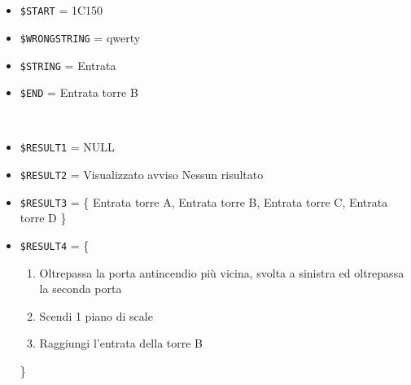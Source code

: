 \documentclass[../../Sperimentazione.tex]{subfiles}
\begin{document}
			\paragraph*{}
			\label{Prova11A.1}
			\begin{tcolorbox}[fonttitle=\bfseries, 
								adjusted title={\Large Prova 11A.1}, 
								breakable, 
								sharp corners=south,
								colback=white, 
								colframe=white!60!black]
								
				\begin{description}[leftmargin=0.7cm,labelwidth=!]
				
					\item[Input] \ \par 
        				\begin{itemize}
        					\item \verb|$START| = 1C150
							\item \verb|$WRONGSTRING| = qwerty
							\item \verb|$STRING| = Entrata 
							\item \verb|$END| = Entrata torre B
        				\end{itemize}
        				
        			\tcbline 
        				
        			\item[Output atteso] \ \par
        				\begin{itemize}
        					\item \verb|$RESULT1| = NULL
        					\item \verb|$RESULT2| = Visualizzato avviso Nessun risultato
        					\item \verb|$RESULT3| = \{
        						Entrata torre A, Entrata torre B, Entrata torre C, Entrata torre D
        						\}
        					\item \verb|$RESULT4| = \{
								\begin{enumerate}
        									\item Oltrepassa la porta antincendio più vicina, svolta a sinistra ed oltrepassa la seconda porta
        									\item Scendi 1 piano di scale
        									\item Raggiungi l'entrata della torre B
        								\end{enumerate}							       
        						\}
        				\end{itemize}

					\tcbline        				
        				

\end{description}
\end{tcolorbox}
\end{document}
